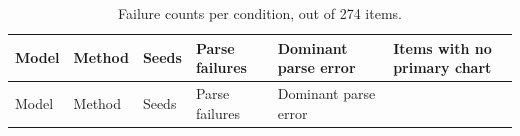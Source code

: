 \begin{landscape}
\begingroup\scriptsize\setlength{\tabcolsep}{3pt}\sloppy
\begin{longtable}[]{@{}
  >{\raggedright\arraybackslash}p{}
  >{\raggedright\arraybackslash}p{}
  >{\raggedright\arraybackslash}p{}
  >{\raggedright\arraybackslash}p{}
  >{\raggedright\arraybackslash}p{}
  >{\raggedright\arraybackslash}p{}@{}}
\caption{Failure counts per condition, out of 274 items.}\tabularnewline
\toprule\noalign{}
\begin{minipage}[b]{\linewidth}\raggedright
Model
\end{minipage} & \begin{minipage}[b]{\linewidth}\raggedright
Method
\end{minipage} & \begin{minipage}[b]{\linewidth}\raggedright
Seeds
\end{minipage} & \begin{minipage}[b]{\linewidth}\raggedright
Parse failures
\end{minipage} & \begin{minipage}[b]{\linewidth}\raggedright
Dominant parse error
\end{minipage} & \begin{minipage}[b]{\linewidth}\raggedright
Items with no primary chart
\end{minipage} \\
\midrule\noalign{}
\endfirsthead
\toprule\noalign{}
\begin{minipage}[b]{\linewidth}\raggedright
Model
\end{minipage} & \begin{minipage}[b]{\linewidth}\raggedright
Method
\end{minipage} & \begin{minipage}[b]{\linewidth}\raggedright
Seeds
\end{minipage} & \begin{minipage}[b]{\linewidth}\raggedright
Parse failures
\end{minipage} & \begin{minipage}[b]{\linewidth}\raggedright
Dominant parse error
\end{minipage} & \begin{minipage}[b]{\linewidth}\raggedright

\end{minipage}
\end{longtable}
\end{landscape}
